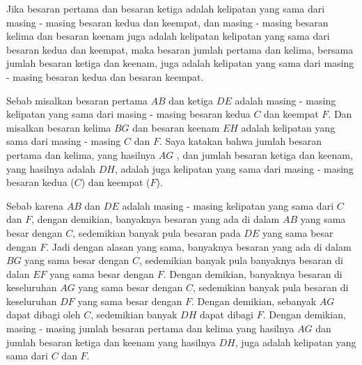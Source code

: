 \documentclass[a4paper]{book}
\begin{document}
\begin{center} 
\end{center}
Jika besaran pertama dan besaran ketiga adalah kelipatan yang sama dari
masing - masing besaran kedua dan keempat, dan masing - masing besaran 
kelima dan besaran keenam juga adalah kelipatan kelipatan yang sama dari
besaran  kedua dan keempat, maka besaran jumlah pertama dan kelima, bersama
jumlah besaran ketiga dan keenam, juga adalah kelipatan yang sama
dari masing - masing besaran kedua dan besaran keempat.


Sebab misalkan besaran pertama $AB$ dan ketiga $DE$ adalah masing - masing
kelipatan yang sama dari masing - masing besaran kedua $C$ dan keempat $F$.
Dan misalkan besaran kelima $BG$ dan besaran keenam $EH$ adalah kelipatan yang
sama dari masing - masing $C$ dan $F$. Saya katakan bahwa jumlah besaran 
pertama dan kelima, yang hasilnya $AG$ , dan jumlah besaran ketiga dan keenam,
yang hasilnya adalah $DH$, adalah juga kelipatan yang sama dari masing - masing 
besaran kedua ($C$) dan keempat ($F$).

Sebab karena $AB$ dan $DE$ adalah masing - masing kelipatan yang sama dari 
$C$ dan $F$, dengan demikian, banyaknya besaran yang ada di dalam $AB$ yang sama
besar dengan $C$, sedemikian banyak pula besaran pada $DE$ yang sama besar dengan
$F$. Jadi dengan alasan yang sama, banyaknya besaran yang ada di dalam
$BG$ yang sama besar dengan $C$, sedemikian banyak pula banyaknya besaran
di dalan $EF$ yang sama besar dengan $F$. Dengan demikian,  banyaknya besaran
di keseluruhan $AG$ yang sama besar dengan $C$, sedemikian banyak pula besaran
di keseluruhan $DF$ yang sama besar dengan $F$. Dengan demikian, sebanyak 
$AG$ dapat dibagi oleh $C$, sedemikian banyak $DH$ dapat dibagi $F$. Dengan 
demikian, masing - masing jumlah besaran pertama dan kelima yang hasilnya $AG$ dan jumlah
besaran ketiga dan keenam yang hasilnya $DH$, juga adalah kelipatan yang sama
dari $C$ dan $F$.
\end{document}
